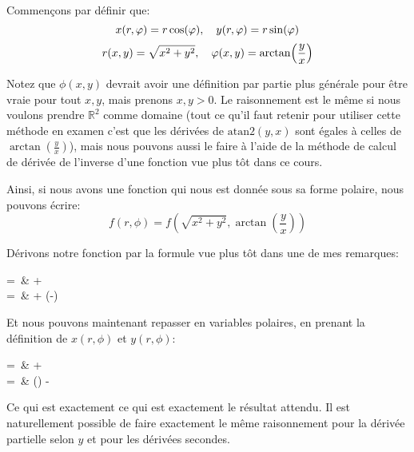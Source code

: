 \documentclass[a4paper]{article}
\begin{document}
{{        Commençons par définir que: 
        \[x\left(r, \phi\right) = r\cos\left(\phi\right), \mathspace y\left(r, \phi\right) = r\sin\left(\phi\right)\] 
        \[r\left(x, y\right) = \sqrt{x^2 + y^2}, \mathspace \phi\left(x, y\right) = \arctan\left(\frac{y}{x}\right)\]
        
        Notez que $\phi\left(x, y\right)$ devrait avoir une définition par partie plus générale pour être vraie pour tout $x, y$, mais prenons $x, y > 0$. Le raisonnement est le même si nous voulons prendre $\mathbb{R}^2$ comme domaine (tout ce qu'il faut retenir pour utiliser cette méthode en examen c'est que les dérivées de $\text{atan2}\left(y, x\right)$ sont égales à celles de $\arctan\left(\frac{y}{x}\right)$), mais nous pouvons aussi le faire à l'aide de la méthode de calcul de dérivée de l'inverse d'une fonction vue plus tôt dans ce cours. 

        Ainsi, si nous avons une fonction qui nous est donnée sous sa forme polaire, nous pouvons écrire: 
        \[f\left(r, \phi\right) = f\left(\sqrt{x^2 + y^2}, \arctan\left(\frac{y}{x}\right)\right)\]
        
        Dérivons notre fonction par la formule vue plus tôt dans une de mes remarques: 
        \begin{multiequality}
         =\ &  \cdot {} +  \cdot {}  \\
        =\ &   +   \left(-\right) \\
        \end{multiequality}
        
        Et nous pouvons maintenant repasser en variables polaires, en prenant la définition de $x\left(r, \phi\right)$ et $y\left(r, \phi\right)$: 
        \begin{multiequality}
         =\ &   +   \\
        =\ &  \cos\left(\phi\right) -  
        \end{multiequality}
        
        Ce qui est exactement ce qui est exactement le résultat attendu. Il est naturellement possible de faire exactement le même raisonnement pour la dérivée partielle selon $y$ et pour les dérivées secondes.
    }
    
}
\end{document}
